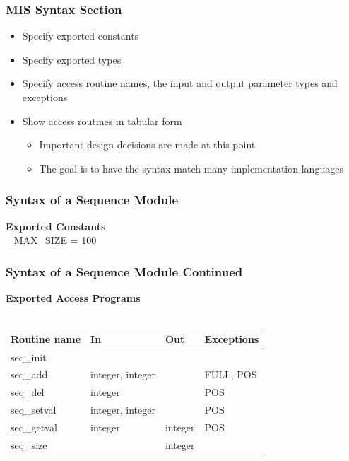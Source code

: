 \documentclass[t, 12pt, numbers, fleqn, handout]{beamer}
\begin{document}

\begin{frame}
\frametitle{MIS Syntax Section}
\begin{itemize}
\item Specify exported constants
\item Specify exported types
\item Specify access routine names, the input and output parameter types and exceptions
\item Show access routines in tabular form
\begin{itemize}
\item Important design decisions are made at this point
\item The goal is to have the syntax match many implementation languages
\end{itemize}
\end{itemize}
\end{frame}


\begin{frame}
\frametitle{Syntax of a Sequence Module}

\textbf{Exported Constants}\\
~\newline
MAX\_SIZE = 100\\

\end{frame}


\begin{frame}
\frametitle{Syntax of a Sequence Module Continued}

\textbf{Exported Access Programs}\\
~\newline
\begin{tabular}{| l | l | l | l |}
\hline
\textbf{Routine name} & \textbf{In} & \textbf{Out} & \textbf{Exceptions}\\
\hline
seq\_init & ~ & ~ & ~\\
\hline
seq\_add & integer, integer & ~ & FULL, POS\\
\hline
seq\_del & integer & ~ & POS\\
\hline
seq\_setval & integer, integer & ~ & POS\\
\hline
seq\_getval & integer & integer & POS\\
\hline
seq\_size & ~ & integer & ~\\
\hline

\end{tabular}

\end{frame}
\end{document}
